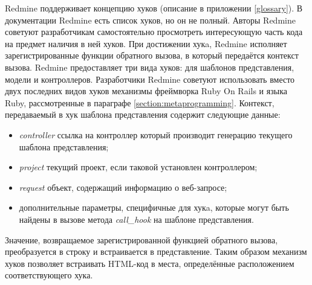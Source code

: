 Redmine поддерживает концепцию хуков (описание в приложении \ref{glossary}).
В документации Redmine есть список хуков, но он не полный. Авторы Redmine
советуют разработчикам самостоятельно просмотреть интересующую часть кода на
предмет наличия в ней хуков. При достижении хукa, Redmine исполняет
зарегистрированные функции обратного вызова, в который передаётся контекст
вызова. Redmine предоставляет три вида хуков: для шаблонов представления,
модели и контроллеров. Разработчики Redmine советуют использовать вместо двух
последних видов хуков механизмы фреймворка Ruby On Rails и языка Ruby,
рассмотренные в параграфе \ref{section:metaprogramming}. Контекст, передаваемый
в хук шаблона представления содержит следующие данные:
\begin{itemize}
  \item \textit{controller} ссылка на контроллер который производит генерацию
  текущего шаблона представления;
  \item \textit{project} текущий проект, если таковой установлен контроллером;
  \item \textit{request} объект, содержащий информацию о веб-запросе;
  \item дополнительные параметры, специфичные для хукa, которые могут
  быть найдены в вызове метода \textit{call\_hook} на шаблоне представления.
\end{itemize}
Значение, возвращаемое зарегистрированной функцией обратного вызова,
преобразуется в строку и встраивается в представление. Таким образом механизм
хуков позволяет встраивать HTML-код в места, определённые расположением
соответствующего хука.

